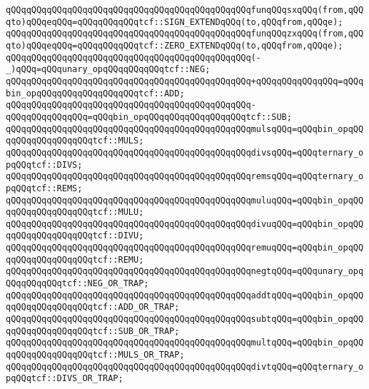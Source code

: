 \verb|qQQqqQQqqQQqqQQqqQQqqQQqqQQqqQQqqQQqqQQqqQQqqQQqfunqQQqsxqQQq(from,qQQqto)qQQqeqQQq=qQQqqQQqqQQqtcf::SIGN_EXTENDqQQq(to,qQQqfrom,qQQqe);|\newline
\verb|qQQqqQQqqQQqqQQqqQQqqQQqqQQqqQQqqQQqqQQqqQQqqQQqfunqQQqzxqQQq(from,qQQqto)qQQqeqQQq=qQQqqQQqqQQqtcf::ZERO_EXTENDqQQq(to,qQQqfrom,qQQqe);|\newline
\newline
\verb|qQQqqQQqqQQqqQQqqQQqqQQqqQQqqQQqqQQqqQQqqQQqqQQq(-_)qQQq=qQQqunary_opqQQqqQQqqQQqtcf::NEG;|\newline
\verb|qQQqqQQqqQQqqQQqqQQqqQQqqQQqqQQqqQQqqQQqqQQqqQQq+qQQqqQQqqQQqqQQq=qQQqbin_opqQQqqQQqqQQqqQQqqQQqtcf::ADD;|\newline
\verb|qQQqqQQqqQQqqQQqqQQqqQQqqQQqqQQqqQQqqQQqqQQqqQQq-qQQqqQQqqQQqqQQq=qQQqbin_opqQQqqQQqqQQqqQQqqQQqtcf::SUB;|\newline
\verb|qQQqqQQqqQQqqQQqqQQqqQQqqQQqqQQqqQQqqQQqqQQqqQQqmulsqQQq=qQQqbin_opqQQqqQQqqQQqqQQqqQQqtcf::MULS;|\newline
\verb|qQQqqQQqqQQqqQQqqQQqqQQqqQQqqQQqqQQqqQQqqQQqqQQqdivsqQQq=qQQqternary_opqQQqtcf::DIVS;|\newline
\verb|qQQqqQQqqQQqqQQqqQQqqQQqqQQqqQQqqQQqqQQqqQQqqQQqremsqQQq=qQQqternary_opqQQqtcf::REMS;|\newline
\verb|qQQqqQQqqQQqqQQqqQQqqQQqqQQqqQQqqQQqqQQqqQQqqQQqmuluqQQq=qQQqbin_opqQQqqQQqqQQqqQQqqQQqtcf::MULU;|\newline
\verb|qQQqqQQqqQQqqQQqqQQqqQQqqQQqqQQqqQQqqQQqqQQqqQQqdivuqQQq=qQQqbin_opqQQqqQQqqQQqqQQqqQQqtcf::DIVU;|\newline
\verb|qQQqqQQqqQQqqQQqqQQqqQQqqQQqqQQqqQQqqQQqqQQqqQQqremuqQQq=qQQqbin_opqQQqqQQqqQQqqQQqqQQqtcf::REMU;|\newline
\newline
\verb|qQQqqQQqqQQqqQQqqQQqqQQqqQQqqQQqqQQqqQQqqQQqqQQqnegtqQQq=qQQqunary_opqQQqqQQqqQQqtcf::NEG_OR_TRAP;|\newline
\verb|qQQqqQQqqQQqqQQqqQQqqQQqqQQqqQQqqQQqqQQqqQQqqQQqaddtqQQq=qQQqbin_opqQQqqQQqqQQqqQQqqQQqtcf::ADD_OR_TRAP;|\newline
\verb|qQQqqQQqqQQqqQQqqQQqqQQqqQQqqQQqqQQqqQQqqQQqqQQqsubtqQQq=qQQqbin_opqQQqqQQqqQQqqQQqqQQqtcf::SUB_OR_TRAP;|\newline
\verb|qQQqqQQqqQQqqQQqqQQqqQQqqQQqqQQqqQQqqQQqqQQqqQQqmultqQQq=qQQqbin_opqQQqqQQqqQQqqQQqqQQqtcf::MULS_OR_TRAP;|\newline
\verb|qQQqqQQqqQQqqQQqqQQqqQQqqQQqqQQqqQQqqQQqqQQqqQQqdivtqQQq=qQQqternary_opqQQqtcf::DIVS_OR_TRAP;|\newline
